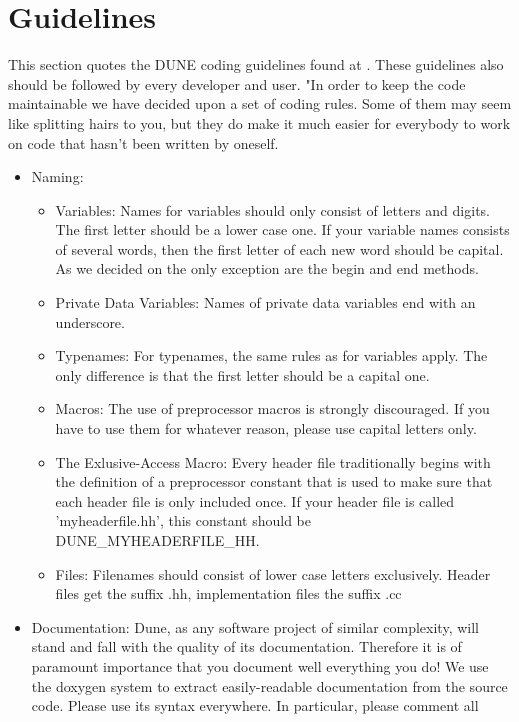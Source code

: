 \section{Guidelines} 
\label{guidelines}

This section quotes the DUNE coding guidelines found at \cite{DUNE-HP}. 
These guidelines also should be followed by every \Dumux developer and user. 
"In order to keep the code maintainable we have decided upon a set of coding rules. 
Some of them may seem like splitting hairs to you, but they do make it much easier 
for everybody to work on code that hasn't been written by oneself.

\begin{itemize}
\item Naming: 
\begin{itemize}
\item Variables: Names for variables should only consist of letters and digits. The first letter should be a lower case one. If your variable names consists of several words, then the first letter of each new word should be capital. As we decided on the only exception are the begin and end methods.
\item Private Data Variables: Names of private data variables end with an underscore.
\item Typenames: For typenames, the same rules as for variables apply. The only difference is that the first letter should be a capital one.
\item Macros: The use of preprocessor macros is strongly discouraged. If you have to use them for whatever reason, please use capital letters only.
\item The Exlusive-Access Macro: Every header file traditionally begins with the definition of a preprocessor constant that is used to make sure that each header file is only included once. If your header file is called 'myheaderfile.hh', this constant should be DUNE\_MYHEADERFILE\_HH.
\item Files: Filenames should consist of lower case letters exclusively. Header files get the suffix .hh, implementation files the suffix .cc
\end{itemize}
\item Documentation:
      Dune, as any software project of similar complexity, will stand and fall with the quality of its documentation.
Therefore it is of paramount importance that you document well everything you do! We use the doxygen system to extract easily-readable documentation from the source code. Please use its syntax everywhere. In particular, please comment all

\end{itemize}
